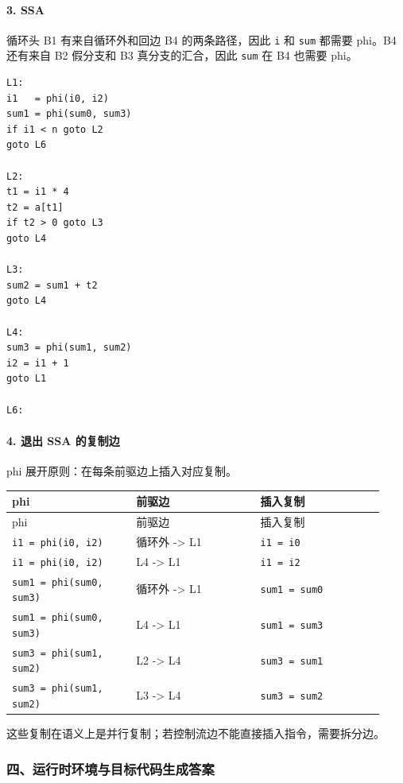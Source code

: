 \documentclass[UTF8]{ctexart}
\begin{document}
\paragraph*{3. SSA}

循环头 B1 有来自循环外和回边 B4 的两条路径，因此 \texttt{i} 和 \texttt{sum} 都需要 phi。B4 还有来自 B2 假分支和 B3 真分支的汇合，因此 \texttt{sum} 在 B4 也需要 phi。

\begin{Verbatim}[fontsize=\small,breaklines=true]
L1:
i1   = phi(i0, i2)
sum1 = phi(sum0, sum3)
if i1 < n goto L2
goto L6

L2:
t1 = i1 * 4
t2 = a[t1]
if t2 > 0 goto L3
goto L4

L3:
sum2 = sum1 + t2
goto L4

L4:
sum3 = phi(sum1, sum2)
i2 = i1 + 1
goto L1

L6:
\end{Verbatim}

\paragraph*{4. 退出 SSA 的复制边}

phi 展开原则：在每条前驱边上插入对应复制。

\begin{longtable}{|p{0.31\linewidth}|p{0.31\linewidth}|p{0.31\linewidth}|}
\hline
phi & 前驱边 & 插入复制 \\
\hline
\endfirsthead
phi & 前驱边 & 插入复制 \\
\hline
\endhead
\texttt{i1 = phi(i0, i2)} & 循环外 -> L1 & \texttt{i1 = i0} \\
\hline
\texttt{i1 = phi(i0, i2)} & L4 -> L1 & \texttt{i1 = i2} \\
\hline
\texttt{sum1 = phi(sum0, sum3)} & 循环外 -> L1 & \texttt{sum1 = sum0} \\
\hline
\texttt{sum1 = phi(sum0, sum3)} & L4 -> L1 & \texttt{sum1 = sum3} \\
\hline
\texttt{sum3 = phi(sum1, sum2)} & L2 -> L4 & \texttt{sum3 = sum1} \\
\hline
\texttt{sum3 = phi(sum1, sum2)} & L3 -> L4 & \texttt{sum3 = sum2} \\
\hline
\end{longtable}

这些复制在语义上是并行复制；若控制流边不能直接插入指令，需要拆分边。

\subsubsection*{四、运行时环境与目标代码生成答案}
\end{document}
